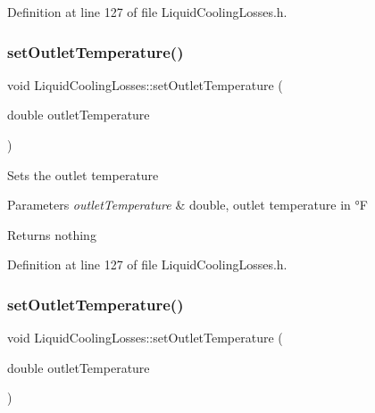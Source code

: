 Definition at line 127 of file Liquid\+Cooling\+Losses.\+h.

\mbox{\label{class_liquid_cooling_losses_ab8ea8e748853e18fa480afa0b3e417ee}} 
\subsubsection{\texorpdfstring{set\+Outlet\+Temperature()}{setOutletTemperature()}\hspace{0.1cm}{\footnotesize\ttfamily [2/3]}}
{\footnotesize\ttfamily void Liquid\+Cooling\+Losses\+::set\+Outlet\+Temperature (\begin{DoxyParamCaption}\item[{double}]{outlet\+Temperature }\end{DoxyParamCaption})\hspace{0.3cm}{\ttfamily [inline]}}

Sets the outlet temperature


\begin{DoxyParams}{Parameters}
{\em outlet\+Temperature} & double, outlet temperature in °F\\
\hline
\end{DoxyParams}
\begin{DoxyReturn}{Returns}
nothing 
\end{DoxyReturn}


Definition at line 127 of file Liquid\+Cooling\+Losses.\+h.

\mbox{\label{class_liquid_cooling_losses_ab8ea8e748853e18fa480afa0b3e417ee}} 
\subsubsection{\texorpdfstring{set\+Outlet\+Temperature()}{setOutletTemperature()}\hspace{0.1cm}{\footnotesize\ttfamily [3/3]}}
{\footnotesize\ttfamily void Liquid\+Cooling\+Losses\+::set\+Outlet\+Temperature (\begin{DoxyParamCaption}\item[{double}]{outlet\+Temperature }\end{DoxyParamCaption})\hspace{0.3cm}{\ttfamily [inline]}}

